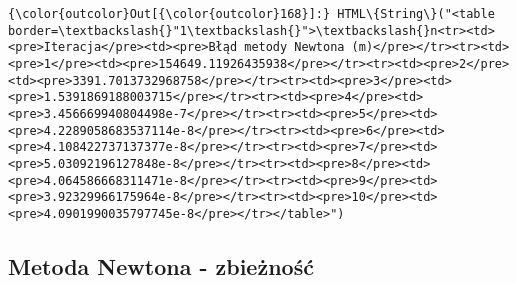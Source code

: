 \documentclass[11pt]{article}
\begin{document}
\begin{Verbatim}[commandchars=\\\{\}]
{\color{outcolor}Out[{\color{outcolor}168}]:} HTML\{String\}("<table border=\textbackslash{}"1\textbackslash{}">\textbackslash{}n<tr><td><pre>Iteracja</pre><td><pre>Błąd metody Newtona (m)</pre></tr><tr><td><pre>1</pre><td><pre>154649.11926435938</pre></tr><tr><td><pre>2</pre><td><pre>3391.7013732968758</pre></tr><tr><td><pre>3</pre><td><pre>1.5391869188003715</pre></tr><tr><td><pre>4</pre><td><pre>3.456669940804498e-7</pre></tr><tr><td><pre>5</pre><td><pre>4.2289058683537114e-8</pre></tr><tr><td><pre>6</pre><td><pre>4.108422737137377e-8</pre></tr><tr><td><pre>7</pre><td><pre>5.03092196127848e-8</pre></tr><tr><td><pre>8</pre><td><pre>4.064586668311471e-8</pre></tr><tr><td><pre>9</pre><td><pre>3.92329966175964e-8</pre></tr><tr><td><pre>10</pre><td><pre>4.0901990035797745e-8</pre></tr></table>")
\end{Verbatim}
            
    \subsection{Metoda Newtona -
zbieżność}\label{metoda-newtona---zbieux17cnoux15bux107}
\end{document}
